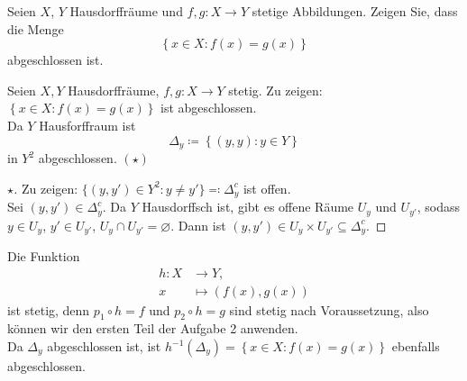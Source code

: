 \begin{assignment}
  Seien \( X \), \( Y \) Hausdorffräume und \( f,g : X \to Y \) stetige Abbildungen. Zeigen Sie, dass die Menge
  \begin{equation*}
    \left \{ x \in X : f(x) = g(x) \right \}
  \end{equation*}
  abgeschlossen ist.
\end{assignment}
\begin{solution}
  Seien \( X, Y \) Hausdorffräume, \( f,g : X \to Y \) stetig. Zu zeigen: \( \left \{ x \in X : f(x) = g(x) \right \} \) ist abgeschlossen. \\
  Da \( Y \) Hausforffraum ist
  \begin{equation*}
    \Delta_y \coloneqq \left \{ (y,y): y \in Y \right \}
  \end{equation*}
  in \( Y^2 \) abgeschlossen. \( (\star) \)
  \begin{proof}[ \( \star \)]
    Zu zeigen: \( \{ (y, y') \in Y^2 : y \neq y' \} \eqqcolon \Delta_y^c \) ist offen. \\
    Sei \( (y,y') \in \Delta_y^c \). Da \( Y \) Hausdorffsch ist, gibt es offene Räume \( U_y \) und \( U_{y'} \), sodass \( y \in U_y \), \( y' \in U_{y'} \), \( U_y \cap U_{y'} = \varnothing \). Dann ist \( (y, y') \in U_y \times U_{y'} \subseteq \Delta_y^c \).
  \end{proof}
  Die Funktion
  \begin{align*}
    h : X &\to Y\text{,} \\
    x &\mapsto (f(x), g(x))
  \end{align*}
  ist stetig, denn \( p_1 \circ h = f \) und \( p_2 \circ h = g \) sind stetig nach Voraussetzung, also können wir den ersten Teil der Aufgabe 2 anwenden. \\
  Da \( \Delta_y \) abgeschlossen ist, ist \( h^{-1}(\Delta_y) = \left \{ x \in X : f(x) = g(x) \right \} \) ebenfalls abgeschlossen.
\end{solution}


